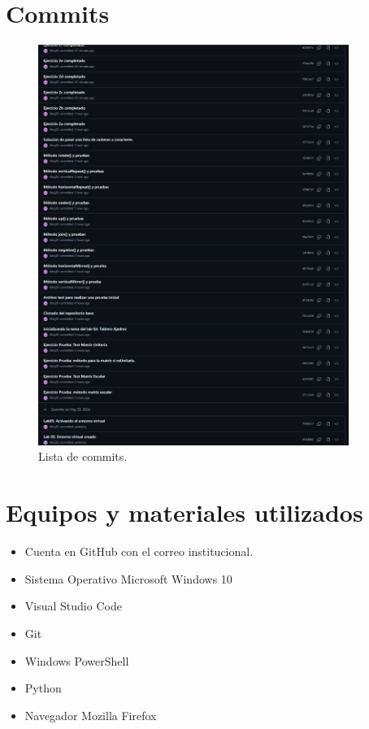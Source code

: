 \documentclass{article}
\begin{document}
\section{Commits}
\begin{figure}[H]
	\centering
	\includegraphics[width=0.9\textwidth,keepaspectratio]{img/commits.png}
	\caption{Lista de commits.}
\end{figure}
\pagebreak
\section{Equipos y materiales utilizados}
\begin{itemize}
	\item Cuenta en GitHub con el correo institucional.
	\item Sistema Operativo Microsoft Windows 10
	\item Visual Studio Code
	\item Git
	\item Windows PowerShell
	\item Python
	\item Navegador Mozilla Firefox
\end{itemize}
\pagebreak
\end{document}
